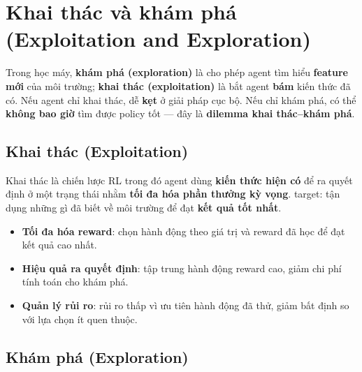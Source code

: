 \section{Khai thác và khám phá (Exploitation and Exploration)}
\label{sec:exploitation-exploration}

\begin{ynghia}[title={Hai chiến lược trong RL}]
Trong học máy, \textbf{khám phá (exploration)} là cho phép agent tìm hiểu \textbf{feature mới} của môi trường;
\textbf{khai thác (exploitation)} là bắt agent \textbf{bám} kiến thức đã có.
Nếu agent chỉ khai thác, dễ \textbf{kẹt} ở giải pháp cục bộ.
Nếu chỉ khám phá, có thể \textbf{không bao giờ} tìm được policy tốt --- đây là \textbf{dilemma khai thác--khám phá}.
\end{ynghia}

\subsection{Khai thác (Exploitation)}

\begin{dinhnghia}[title={Exploitation}]
Khai thác là chiến lược RL trong đó agent dùng \textbf{kiến thức hiện có} để ra quyết định ở một trạng thái nhằm \textbf{tối đa hóa phần thưởng kỳ vọng}.
target: tận dụng những gì đã biết về môi trường để đạt \textbf{kết quả tốt nhất}.
\end{dinhnghia}

\begin{tinhchat}[title={Các khía cạnh chính của khai thác}]
\begin{itemize}
  \item \textbf{Tối đa hóa reward}: chọn hành động theo giá trị và reward đã học để đạt kết quả cao nhất.
  \item \textbf{Hiệu quả ra quyết định}: tập trung hành động reward cao, giảm chi phí tính toán cho khám phá.
  \item \textbf{Quản lý rủi ro}: rủi ro thấp vì ưu tiên hành động đã thử, giảm bất định so với lựa chọn ít quen thuộc.
\end{itemize}
\end{tinhchat}

\subsection{Khám phá (Exploration)}

